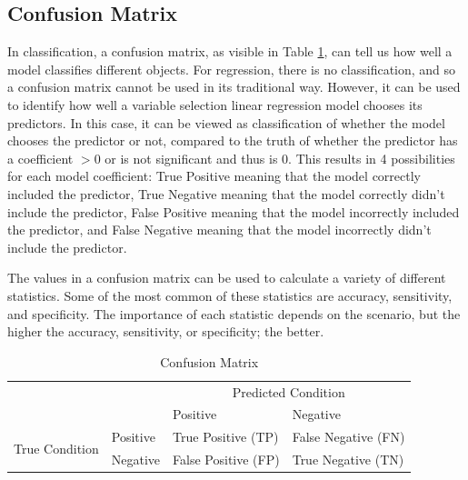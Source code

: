 \documentclass{article}
\begin{document}
\subsection{Confusion Matrix}
In classification, a confusion matrix, as visible in Table \ref{tab:confusion_matrix}, can tell us how well a model classifies different objects. For regression, there is no classification, and so a confusion matrix cannot be used in its traditional way. However, it can be used to identify how well a variable selection linear regression model chooses its predictors. In this case, it can be viewed as classification of whether the model chooses the predictor or not, compared to the truth of whether the predictor has a coefficient $> 0$ or is not significant and thus is 0. This results in 4 possibilities for each model coefficient: True Positive meaning that the model correctly included the predictor, True Negative meaning that the model correctly didn't include the predictor, False Positive meaning that the model incorrectly included the predictor, and False Negative meaning that the model incorrectly didn't include the predictor.


The values in a confusion matrix can be used to calculate a variety of different statistics. Some of the most common of these statistics are accuracy, sensitivity, and specificity. The importance of each statistic depends on the scenario, but the higher the accuracy, sensitivity, or specificity; the better.

\begin{table}[h!]
	\centering
	\begin{tabular}{llll}
		&                       & \multicolumn{2}{c}{Predicted Condition}                       \\ \cline{3-4} 
		& \multicolumn{1}{l|}{} & \multicolumn{1}{l|}{Positive} & \multicolumn{1}{l|}{Negative} \\ \cline{2-4} 
		\multicolumn{1}{c|}{\multirow{2}{*}{True Condition}} & \multicolumn{1}{l|}{Positive} & \multicolumn{1}{l|}{True Positive (TP)} & \multicolumn{1}{l|}{False Negative (FN)} \\ \cline{2-4} 
		\multicolumn{1}{c|}{}                                & \multicolumn{1}{l|}{Negative} & \multicolumn{1}{l|}{False Positive (FP)} & \multicolumn{1}{l|}{True Negative (TN)}  \\ \cline{2-4} 
	\end{tabular}
	\caption{Confusion Matrix}
	\label{tab:confusion_matrix}
\end{table}
\end{document}
